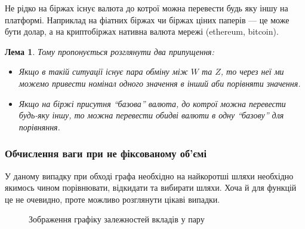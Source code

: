 \documentclass[a4paper, 12pt]{article}
\newtheorem{lemma}{Лема}
\begin{document}
 Не рідко на біржах існує валюта до котрої можна перевести будь яку іншу на
 платформі. Наприклад на фіатних біржах чи біржах ціних паперів --- це може бути
 долар, а на криптобіржах нативна валюта мережі (ethereum, bitcoin).

\begin{lemma}
  Тому пропонується розглянути два припущення:

  \begin{itemize}
    \item Якщо в такій ситуації існує пара обміну між $W$ та $Z$, то через неї
		  ми можемо привести номінал одного значення в інший аби порівняти
		  значення.
    \item Якщо на біржі присутня ``базова'' валюта, до котрої можна перевести
		  будь-яку іншу, то можна перевести обидві валюти в одну ``базову'' для
		  порівняння.
  \end{itemize}
\end{lemma}

\subsubsection{Обчислення ваги при не фіксованому об'ємі}

У даному випадку при обході графа необхідно на найкоротші шляхи необхідно
якимось чином порівнювати, відкидати та вибирати шляхи. Хоча й для функцій
це не очевидно, проте можливо розглянути цікаві випадки.

\begin{figure}[h!]
  \centering
  \caption{Зображення графіку залежностей вкладів у пару}\label{fig:isoquant}
\end{figure}

\newpage

\printbibliography{}
\newpage
\end{document}
